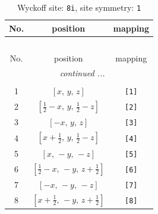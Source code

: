 \documentclass[fleqn,8pt]{jsarticle}
\begin{document}
\renewcommand{\arraystretch}{1.2}
\begin{longtable}{ccc}
\caption{Wyckoff site: {\tt 8i}, site symmetry: {\tt 1}}
 \\
 \hline \hline
No. & position & mapping \\ \hline \endfirsthead

\multicolumn{2}{l}{\tablename\ \thetable{}} \\
 \hline \hline
No. & position & mapping \\ \hline \endhead

 \hline \hline
\multicolumn{2}{r}{\footnotesize\it continued ...} \\ \endfoot

 \hline \hline
\multicolumn{2}{r}{} \\ \endlastfoot

1 & $\left[ x,\, y,\, z \right]$ & {\tt [1]} \\ \hline
2 & $\left[ \frac{1}{2} - x,\, y,\, \frac{1}{2} - z \right]$ & {\tt [2]} \\ \hline
3 & $\left[ - x,\, y,\, z \right]$ & {\tt [3]} \\ \hline
4 & $\left[ x + \frac{1}{2},\, y,\, \frac{1}{2} - z \right]$ & {\tt [4]} \\ \hline
5 & $\left[ x,\, - y,\, - z \right]$ & {\tt [5]} \\ \hline
6 & $\left[ \frac{1}{2} - x,\, - y,\, z + \frac{1}{2} \right]$ & {\tt [6]} \\ \hline
7 & $\left[ - x,\, - y,\, - z \right]$ & {\tt [7]} \\ \hline
8 & $\left[ x + \frac{1}{2},\, - y,\, z + \frac{1}{2} \right]$ & {\tt [8]} \\
\end{longtable}
\end{document}
